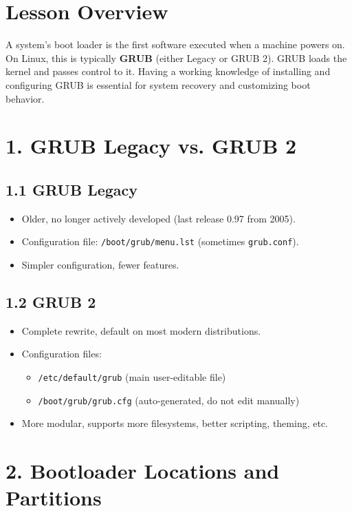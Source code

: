 \documentclass[12pt,a4paper]{report}
\begin{document}
\section*{Lesson Overview}

A system’s boot loader is the first software executed when a machine powers on. On Linux, this is typically \textbf{GRUB} (either Legacy or GRUB 2). GRUB loads the kernel and passes control to it. Having a working knowledge of installing and configuring GRUB is essential for system recovery and customizing boot behavior.



\section*{1. GRUB Legacy vs. GRUB 2}

\subsection*{1.1 GRUB Legacy}
\begin{itemize}
    \item Older, no longer actively developed (last release 0.97 from 2005).  
    \item Configuration file: \texttt{/boot/grub/menu.lst} (sometimes \texttt{grub.conf}).  
    \item Simpler configuration, fewer features.
\end{itemize}

\subsection*{1.2 GRUB 2}
\begin{itemize}
    \item Complete rewrite, default on most modern distributions.  
    \item Configuration files:  
    \begin{itemize}
        \item \texttt{/etc/default/grub} (main user-editable file)  
        \item \texttt{/boot/grub/grub.cfg} (auto-generated, do not edit manually)  
    \end{itemize}
    \item More modular, supports more filesystems, better scripting, theming, etc.
\end{itemize}



\section*{2. Bootloader Locations and Partitions}
\end{document}
